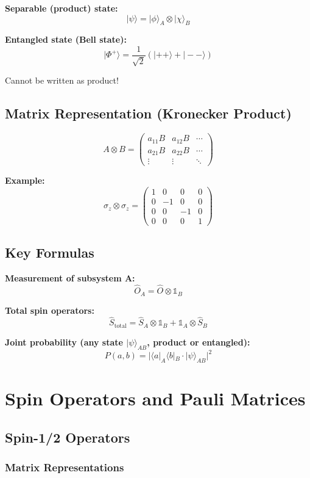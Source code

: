\documentclass[11pt,a4paper]{article}
\begin{document}
\textbf{Separable (product) state:}
$$|\psi\rangle = |\phi\rangle_A \otimes |\chi\rangle_B$$

\textbf{Entangled state (Bell state):}
$$|\Phi^+\rangle = \frac{1}{\sqrt{2}}(|++\rangle + |--\rangle)$$

Cannot be written as product!

\subsection{Matrix Representation (Kronecker Product)}

$$A \otimes B = \begin{pmatrix}
a_{11}B & a_{12}B & \cdots \\
a_{21}B & a_{22}B & \cdots \\
\vdots & \vdots & \ddots
\end{pmatrix}$$

\textbf{Example:}
$$\sigma_z \otimes \sigma_z = \begin{pmatrix}
1 & 0 & 0 & 0 \\
0 & -1 & 0 & 0 \\
0 & 0 & -1 & 0 \\
0 & 0 & 0 & 1
\end{pmatrix}$$

\subsection{Key Formulas}

\textbf{Measurement of subsystem A:}
$$\hat{O}_A = \hat{O} \otimes \mathbb{1}_B$$

\textbf{Total spin operators:}
$$\hat{S}_{\text{total}} = \hat{S}_A \otimes \mathbb{1}_B + \mathbb{1}_A \otimes \hat{S}_B$$

\textbf{Joint probability (any state $|\psi\rangle_{AB}$, product or entangled):}
$$P(a, b) = |\langle a|_A\langle b|_B \cdot |\psi\rangle_{AB}|^2$$
\newpage
\section{Spin Operators and Pauli Matrices}

\subsection{Spin-1/2 Operators}

\subsubsection{Matrix Representations}
\end{document}
